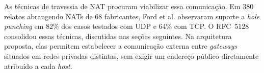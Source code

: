 As técnicas de travessia de NAT procuram viabilizar essa comunicação. Em 380 relatos abrangendo NATs de 68 fabricantes, Ford et al. \citep{ford2005peer} observaram suporte a \textit{hole punching} em 82\% dos casos testados com UDP e 64\% com TCP. O RFC~5128 \citep{rfc5128} consolidou essas técnicas, discutidas nas seções seguintes. Na arquitetura proposta, elas permitem estabelecer a comunicação externa entre \textit{gateways} situados em redes privadas distintas, sem exigir um endereço público diretamente atribuído a cada \textit{host}.

